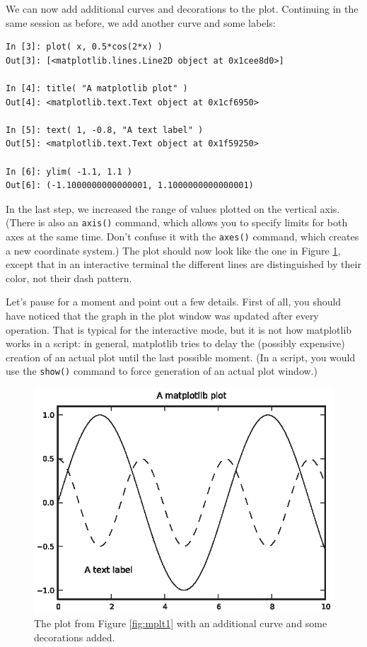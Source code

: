 We can now add additional curves and decorations to the plot. Continuing
in the same session as before, we add another curve and some labels:

\begin{verbatim}
In [3]: plot( x, 0.5*cos(2*x) )
Out[3]: [<matplotlib.lines.Line2D object at 0x1cee8d0>]

In [4]: title( "A matplotlib plot" )
Out[4]: <matplotlib.text.Text object at 0x1cf6950>

In [5]: text( 1, -0.8, "A text label" )
Out[5]: <matplotlib.text.Text object at 0x1f59250>

In [6]: ylim( -1.1, 1.1 )
Out[6]: (-1.1000000000000001, 1.1000000000000001)
\end{verbatim}

In the last step, we increased the range of values plotted on the
vertical axis. (There is also an \texttt{axis()} command, which allows
you to specify limits for both axes at the same time. Don't confuse it
with the \texttt{axes()} command, which creates a new coordinate
system.) The plot should now look like the one in Figure
\ref{fig:mplt2}, except that in an interactive terminal the different
lines are distinguished by their color, not their dash pattern.




Let's pause for a moment and point out a few details. First of all,
you should have noticed that the graph in the plot window was updated
after every operation. That is typical for the interactive mode, but it
is not how matplotlib works in a script: in general, matplotlib tries
to delay the (possibly expensive) creation of an actual plot until the
last possible moment. (In a script, you would use the \texttt{show()}
command to force generation of an actual plot window.)


\begin{figure}
   \centerline{\includegraphics{img/mplt2}}
  \caption{The plot from Figure \ref{fig:mplt1} with an additional
    curve and some decorations added.}
  \label{fig:mplt2}\vspace*{-18pt}
\end{figure}

